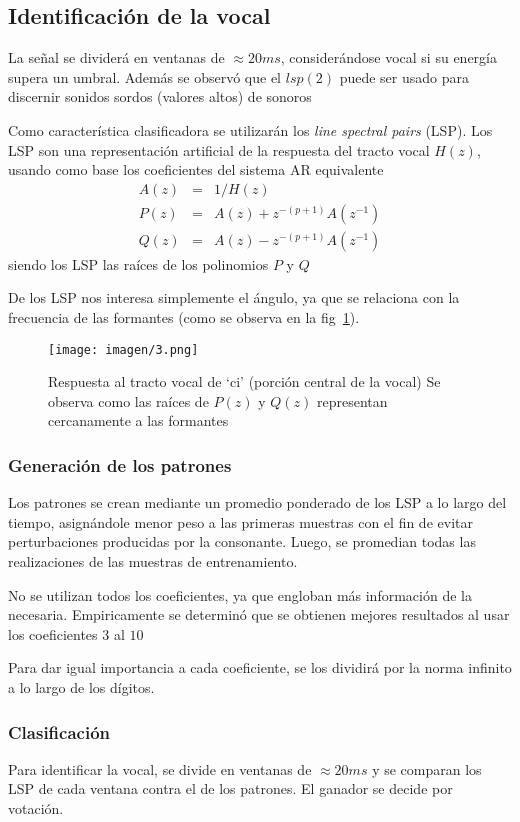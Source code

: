 \documentclass[conference,a4paper,10pt,oneside,final]{tfmpd}
\begin{document}
	\subsection{Identificación de la vocal}
		La señal se dividerá en ventanas de $\approx 20ms$, considerándose vocal si 
		su energía supera un umbral. 
		Además se observó que el $lsp(2)$ puede ser usado para discernir sonidos sordos (valores altos) 
		de sonoros

		Como característica clasificadora se utilizarán los \emph{line spectral pairs} (LSP).
		Los LSP son una representación artificial de la respuesta del tracto vocal $H(z)$,
		usando como base los coeficientes del sistema AR equivalente
		\begin{eqnarray*}
			A(z) &=& 1/H(z) \\
			P(z) &=& A(z) + z^{-(p+1)}A(z^{-1}) \\
			Q(z) &=& A(z) - z^{-(p+1)}A(z^{-1})
		\end{eqnarray*}
		siendo los LSP las raíces de los polinomios $P$ y $Q$

		De los LSP nos interesa simplemente el ángulo, 
		ya que se relaciona con la frecuencia de las formantes 
		(como se observa en la fig~\ref{fig:tracto}).
		\begin{figure}
			\texttt{[image: imagen/3.png]}
			\caption{
				Respuesta al tracto vocal de `ci' (porción central de la vocal)
				Se observa como las raíces de $P(z)$ y $Q(z)$ representan cercanamente a las formantes
			}
			\label{fig:tracto}
		\end{figure}

		\subsubsection{Generación de los patrones}
		Los patrones se crean mediante un promedio ponderado de los LSP
		a lo largo del tiempo, asignándole menor peso a las primeras muestras
		con el fin de evitar perturbaciones producidas por la consonante.
		Luego, se promedian todas las realizaciones de las muestras de entrenamiento.

		No se utilizan todos los coeficientes,
		ya que engloban más información de la necesaria.
		Empiricamente se determinó que se obtienen mejores resultados 
		al usar los coeficientes $3$ al $10$

		Para dar igual importancia a cada coeficiente, se los dividirá por la norma infinito
		a lo largo de los dígitos.
			
		\subsubsection{Clasificación}
		Para identificar la vocal, se divide en ventanas de $\approx 20ms$ y se comparan los
		LSP de cada ventana contra el de los patrones.
		El ganador se decide por votación.
\end{document}
